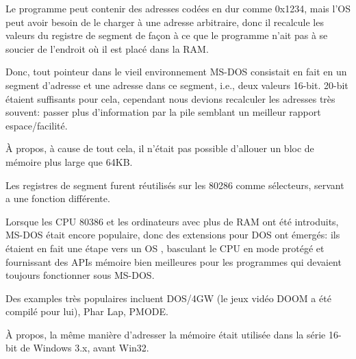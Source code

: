 Le programme peut contenir des adresses codées en dur comme 0x1234, mais l'\ac{OS}
peut avoir besoin de le charger à une adresse arbitraire, donc il recalcule les valeurs
du registre de segment de façon à ce que le programme n'ait pas à se soucier de
l'endroit où il est placé dans la RAM.

Donc, tout pointeur dans le vieil environnement MS-DOS consistait en fait en un segment
d'adresse et une adresse dans ce segment, i.e., deux valeurs 16-bit. 20-bit étaient
suffisants pour cela, cependant nous devions recalculer les adresses très souvent:
passer plus d'information par la pile semblant un meilleur rapport espace/facilité.

À propos, à cause de tout cela, il n'était pas possible d'allouer un bloc de mémoire
plus large que 64KB.


Les registres de segment furent réutilisés sur les 80286 comme sélecteurs, servant
a une fonction différente.


Lorsque les CPU 80386 et les ordinateurs avec plus de \ac{RAM} ont été introduits,
MS-DOS était encore populaire, donc des extensions pour DOS ont émergés: ils étaient
en fait une étape vers un \ac{OS} , basculant le CPU en mode protégé et
fournissant des \ac{API}s mémoire bien meilleures pour les programmes qui devaient
toujours fonctionner sous MS-DOS.

Des examples très populaires incluent DOS/4GW (le jeux vidéo DOOM a été compilé pour
lui), Phar Lap, PMODE.
\par
{}

À propos, la même manière d'adresser la mémoire était utilisée dans la série 16-bit
de Windows 3.x, avant Win32.

